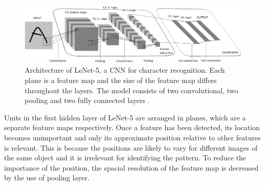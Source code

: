 %
 
\begin{figure} [H]
\centering
\includegraphics[width=1.0\textwidth]{figures/LeNet5}
\caption{Architecture of LeNet-5, a CNN for character recognition. Each plane is a feature map and the size of the feature map differs throughout the layers. The model consists of two convolutional, two pooling and two fully connected layers \citep{LeCun1998}.}
\label{fig:LeNet5}  
\end{figure}

\noindent
Units in the first hidden layer of LeNet-5 are arranged in planes, which are a separate feature maps respectively. Once a feature has been detected, its location becomes unimportant and only its approximate position relative to other features is relevant. This is because the positions are likely to vary for different images of the same object and it is irrelevant for identifying the pattern. To reduce the importance of the position, the spacial resolution of the feature map is decreased by the use of pooling layer.\citep{LeCun1998}



